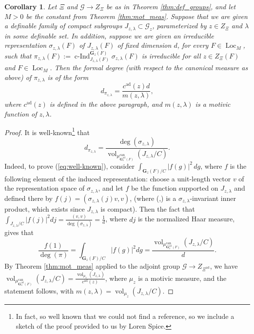 \documentclass{amsart}
\newcommand{\cF}{\mathcal{F}}
\newcommand{\cG}{\mathcal{G}}
\DeclareMathOperator{\vol}{vol}
\DeclareMathOperator{\loc}{Loc}
\DeclareMathOperator{\ind}{c-Ind}
\newcommand{\bG}{\mathbf{G}}
\newcommand{\can}{\mathrm{can}}
\newcommand\ad{\mathrm{ad}}
\theoremstyle{plain}
\newtheorem{cor}[thm]{Corollary}
\theoremstyle{definition}
\begin{document}
\begin{cor}  Let $\Xi$ 
and $\cG \to Z_\Xi$ be as in Theorem \ref{thm:def_groups}, and let $M>0$ be the constant from Theorem \ref{thm:mot_meas}.
Suppose that we are given a definable family of compact subgroups $J_{z, \lambda} \subset \cG_z$,
parameterized by $z \in Z_\Xi$ and $\lambda$ in some definable set.
In addition, suppose we are given an irreducible representation  
$\sigma_{z, \lambda}(F)$ of $J_{z, \lambda}(F)$ of fixed dimension $d$, for every $F\in \loc_M$, such 
that $\pi_{z,\lambda}(F) := \ind_{J_{z,\lambda}(F)}^{\bG_z(F)} \sigma_{z,\lambda}(F)$
is irreducible for all $z \in Z_\Xi(F)$ and $F \in \loc_M$.
Then the formal degree (with respect to the canonical measure as above) of $\pi_{z, \lambda}$ is of the form 
\[
d_{\pi_{z, \lambda}}=\frac{c^\ad(z)d}{m(z, \lambda)},
\]
where $c^\ad(z)$ is defined in the above paragraph, and 
$m(z, \lambda)$ is a motivic function of $z, \lambda$. 
\end{cor}
\begin{proof}
It is well-known\footnote{In fact, so well known that we could not find a reference, so we include a sketch of the proof provided to us by Loren Spice.} that
\begin{equation}\label{eq:well-known}
d_{\pi_{z, \lambda}}=\frac{\deg(\sigma_{z, \lambda})}{\vol_{\mu_{\bG_z^\ad(F)}^\can}(J_{z, \lambda}/C)}.
\end{equation}
Indeed, to prove (\ref{eq:well-known}), 
consider $\int_{\bG_z(F)/C} |f(g)|^2\, dg$, where $f$ is the
following element of the induced representation:  choose a unit-length
vector $v$ of the representation space of $\sigma_{z,\lambda}$, and let $f$ be the function supported on $J_{z, \lambda}$ 
and defined there by
$f(j) = (\sigma_{z, \lambda}(j)v, v)$, (where (,) is a $\sigma_{z, \lambda}$-invariant inner product, which exists since 
$J_{z, \lambda}$ is compact).  Then the
fact that $\int_{J_{z, \lambda}/C} |f(j)|^2 dj = \frac{(v, v)}{\deg(\sigma_{z, \lambda})} = \frac1d$, where $dj$
is the normalized Haar measure, gives that 
$$\frac{f(1)}{\deg(\pi)} = \int_{\bG_z(F)/C}|f(g)|^2 dg = \frac{\vol_{\mu_{\bG_z^\ad(F)}^\can}(J_{z, \lambda}/C)}{d}.$$ 
By Theorem \ref{thm:mot_meas} applied to the adjoint group $\cG\to Z_{\Xi^\ad}$, we have $\vol_{\mu_{\bG_z^\ad(F)}^\can}(J_{z, \lambda}/C) = \frac{\vol_{\mu_z}(J_{z, \lambda})}{c^\ad(z)}$, where $\mu_z$ is a motivic measure, 
and the statement follows, with $m(z, \lambda)=\vol_{\mu_z}(J_{z, \lambda}/C)$.
\end{proof}
\end{document}
